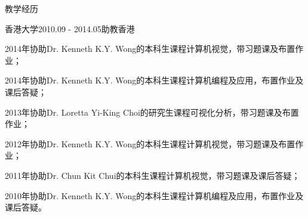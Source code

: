 \documentclass{cv_professional-cn} %
\makeatletter
\newcommand{\specialcell}[2][c]{%
    \begin{tabular}[#1]{@{}l@{}}#2\end{tabular}}
\makeatother
\begin{document}
\begin{rSection}{教学经历}

\begin{rSubsection}{香港大学}{2010.09 - 2014.05}{助教}{香港}
    \item 2014年协助Dr. Kenneth K.Y. Wong的本科生课程计算机视觉，带习题课及布置作业；
    \item 2014年协助Dr. Kenneth K.Y. Wong的本科生课程计算机编程及应用，布置作业及课后答疑；
    \item 2013年协助Dr. Loretta Yi-King Choi的研究生课程可视化分析，带习题课及布置作业；
    \item 2012年协助Dr. Kenneth K.Y. Wong的本科生课程计算机视觉，带习题课及布置作业；
    \item 2011年协助Dr. Chun Kit Chui的本科生课程计算机视觉，带习题课及课后答疑；
    \item 2010年协助Dr. Kenneth K.Y. Wong的本科生课程计算机编程及应用，布置作业及课后答疑。
\end{rSubsection}

\end{rSection}


\end{document}
